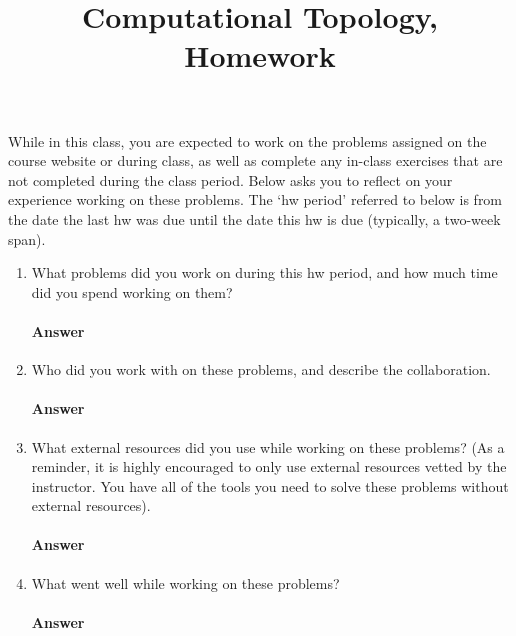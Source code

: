\documentclass{article}
\title{Computational Topology, Homework \todo{}}
\author{\todo{Put Your Name Here}}
\begin{document}
\maketitle

While in this class, you are expected to work on the problems assigned on the
course website or during class,
as well as complete any in-class exercises that are not completed
during the class period.
Below asks you to reflect on your experience working on these problems. The
`hw period' referred to below is from the date the last hw was due until the date
this hw is due (typically, a two-week span).

\begin{enumerate}
    \item What problems did you work on during this hw period, and how much time
        did you spend working on them?

        \paragraph{Answer}

    \item Who did you work with on these problems, and describe the collaboration.

        \paragraph{Answer}

    \item What external resources did you use while working on these problems?
        (As a reminder, it is highly encouraged to only use external resources
        vetted by the instructor. You have all of the tools you need to solve
        these problems without external resources).

        \paragraph{Answer}

    \item What went well while working on these problems?

        \paragraph{Answer}


\end{enumerate}
\end{document}
